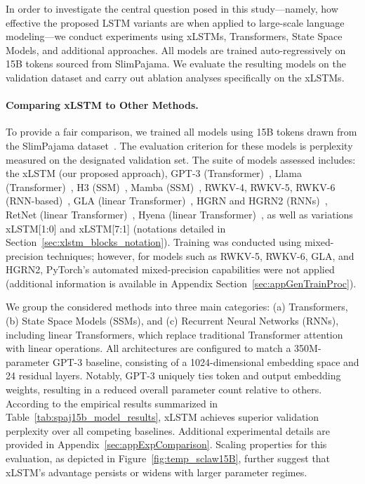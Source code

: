 In order to investigate the central question posed in this study—namely, how effective the proposed LSTM variants are when applied to large-scale language modeling—we conduct experiments using xLSTMs, Transformers, State Space Models, and additional approaches. All models are trained auto-regressively on 15B tokens sourced from SlimPajama. We evaluate the resulting models on the validation dataset and carry out ablation analyses specifically on the xLSTMs.

\paragraph{Comparing xLSTM to Other Methods.} To provide a fair comparison, we trained all models using 15B tokens drawn from the SlimPajama dataset~\citep{Soboleva:23}. The evaluation criterion for these models is perplexity measured on the designated validation set. The suite of models assessed includes: the xLSTM (our proposed approach), GPT-3 (Transformer)~\citep{Brown:20short}, Llama (Transformer)~\citep{Touvron:23arxiv}, H3 (SSM)~\citep{Fu:23}, Mamba (SSM)~\citep{Gu:24arxiv}, RWKV-4, RWKV-5, RWKV-6 (RNN-based)~\citep{Peng:23arxivshort, Peng:24arxivshort}, GLA (linear Transformer)~\citep{Yang:23arxiv}, HGRN and HGRN2 (RNNs)~\citep{Qin:23, Qin:24arxiv}, RetNet (linear Transformer)~\citep{Sun:23arxiv}, Hyena (linear Transformer)~\citep{Poli:23}, as well as variations xLSTM[1:0] and xLSTM[7:1] (notations detailed in Section~\ref{sec:xlstm_blocks_notation}). Training was conducted using mixed-precision techniques; however, for models such as RWKV-5, RWKV-6, GLA, and HGRN2, PyTorch’s automated mixed-precision capabilities were not applied (additional information is available in Appendix Section~\ref{sec:appGenTrainProc}). 

We group the considered methods into three main categories: (a) Transformers, (b) State Space Models (SSMs), and (c) Recurrent Neural Networks (RNNs), including linear Transformers, which replace traditional Transformer attention with linear operations. All architectures are configured to match a 350M-parameter GPT-3 baseline, consisting of a 1024-dimensional embedding space and 24 residual layers. Notably, GPT-3 uniquely ties token and output embedding weights, resulting in a reduced overall parameter count relative to others. According to the empirical results summarized in Table~\ref{tab:spaj15b_model_results}, xLSTM achieves superior validation perplexity over all competing baselines. Additional experimental details are provided in Appendix~\ref{sec:appExpComparison}. Scaling properties for this evaluation, as depicted in Figure~\ref{fig:temp_sclaw15B}, further suggest that xLSTM's advantage persists or widens with larger parameter regimes.

